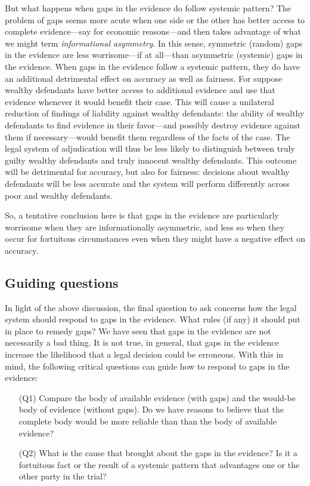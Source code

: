 \documentclass[
  10pt,
  dvipsnames,enabledeprecatedfontcommands]{scrartcl}
\begin{document}
But what happens when gaps in the evidence do follow systemic pattern?
The problem of gaps seems more acute when one side or the other has
better access to complete evidence---say for economic reasons---and then
takes advantage of what we might term \textit{informational asymmetry}.
In this sense, symmetric (random) gaps in the evidence are less
worrisome---if at all---than asymmetric (systemic) gaps in the evidence.
When gaps in the evidence follow a systemic pattern, they do have an
additional detrimental effect on accuracy as well as fairness. For
suppose wealthy defendants have better access to additional evidence and
use that evidence whenever it would benefit their case. This will cause
a unilateral reduction of findings of liability against wealthy
defendants: the ability of wealthy defendants to find evidence in their
favor---and possibly destroy evidence against them if necessary---would
benefit them regardless of the facts of the case. The legal system of
adjudication will thus be less likely to distinguish between truly
guilty wealthy defendants and truly innocent wealthy defendants. This
outcome will be detrimental for accuracy, but also for fairness:
decisions about wealthy defendants will be less accurate and the system
will perform differently across poor and wealthy defendants.

So, a tentative conclusion here is that gaps in the evidence are
particularly worrisome when they are informationally asymmetric, and
less so when they occur for fortuitous circumstances even when they
might have a negative effect on accuracy.

\hypertarget{guiding-questions}{%
\subsection{Guiding questions}\label{guiding-questions}}

In light of the above discussion, the final question to ask concerns how
the legal system should respond to gaps in the evidence. What rules (if
any) it should put in place to remedy gaps? We have seen that gaps in
the evidence are not necessarily a bad thing. It is not true, in
general, that gaps in the evidence increase the likelihood that a legal
decision could be erroneous. With this in mind, the following critical
questions can guide how to respond to gaps in the evidence:

\begin{itemize}

\item[(Q1)] Compare the body of available evidence (with gaps) and the would-be body of evidence (without gaps). Do we have reasons to believe that the complete body would be more reliable than than the body of available evidence? 

\item[(Q2)] What is the cause that brought about the gaps in the evidence? Is it a fortuitous fact or the result of a systemic pattern that advantages one or the other party in the trial? 

\end{itemize}
\end{document}
